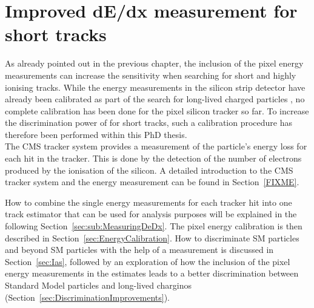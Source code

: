 \FloatBarrier
\chapter{Improved dE/dx measurement for short tracks}
\label{sec:DeDxMeasurement}
As already pointed out in the previous chapter, the inclusion of the pixel energy measurements can increase the sensitivity when searching for short and highly ionising tracks.
While the energy measurements in the silicon strip detector have already been calibrated as part of the search for long-lived charged particles \cite{bib:CMS:HSCP_8TeV}, no complete calibration has been done for the pixel silicon tracker so far.
To increase the discrimination power of \dedx for short tracks, such a calibration procedure has therefore been performed within this PhD thesis.\\

The CMS tracker system provides a measurement of the particle's energy loss for each hit in the tracker.
This is done by the detection of the number of electrons produced by the ionisation of the silicon.
A detailed introduction to the CMS tracker system and the energy measurement can be found in Section~\ref{FIXME}.

How to combine the single energy measurements for each tracker hit into one track \dedx estimator that can be used for analysis purposes will be explained in the following Section~\ref{sec:sub:MeasuringDeDx}.
The pixel energy calibration is then described in Section~\ref{sec:EnergyCalibration}. 
How to discriminate SM particles and beyond SM particles with the help of a \dedx measurement is discussed in Section~\ref{sec:Ias}, followed by an exploration of how the inclusion of the pixel energy measurements in the \dedx estimates leads to a better discrimination between Standard Model particles and long-lived charginos (Section~\ref{sec:DiscriminationImprovements}).


